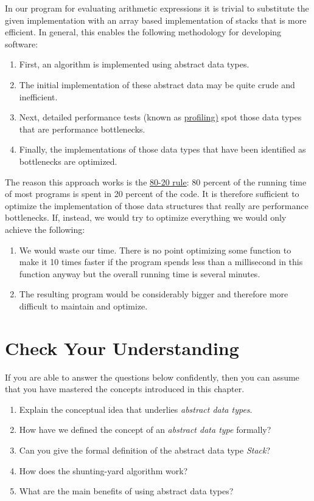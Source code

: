 \begin{enumerate}
       In our program for evaluating  arithmetic expressions it is trivial to substitute the given
       implementation with an array based implementation of stacks that is more efficient.  In general,
       this enables the following methodology for developing software:  
       \begin{enumerate}
       \item First, an algorithm is implemented using abstract data types.
       \item The initial implementation of these abstract data may be quite crude and inefficient.
       \item Next, detailed performance tests (known as 
             \href{http://en.wikipedia.org/wiki/Profiling_(computer_programming)}{profiling)}
             spot those data types that are performance bottlenecks.
       \item Finally, the implementations of those data types that have been identified as bottlenecks are optimized.
       \end{enumerate}
       The reason this approach works is the 
       \href{http://en.wikipedia.org/wiki/Pareto_principle#In_software}{80-20 rule}:  
       80 percent of the running time of most programs is spent in 20 percent of the code.  It is
       therefore sufficient to optimize the 
       implementation of those data structures that really are performance bottlenecks.  If,
       instead, we would try to optimize everything we would only achieve the following:
       \begin{enumerate}
       \item We would waste our time.  There is no point optimizing some function to make it 10 times
             faster if the program spends less than a millisecond in this function anyway but the
             overall running time is several minutes.
       \item The resulting program would be considerably bigger and therefore more difficult to 
             maintain and optimize.
       \end{enumerate}
 \end{enumerate}

\section{Check Your Understanding}
If you are able to answer the questions below confidently, then you can assume that you have mastered the concepts
introduced in this chapter.
\begin{enumerate}
\item Explain the conceptual idea that underlies \emph{abstract data types}.
\item How have we defined the concept of an \emph{abstract data type} formally?
\item Can you give the formal definition of the abstract data type \textsl{Stack}?
\item How does the shunting-yard algorithm work?
\item What are the main benefits of using abstract data types?
\end{enumerate}



